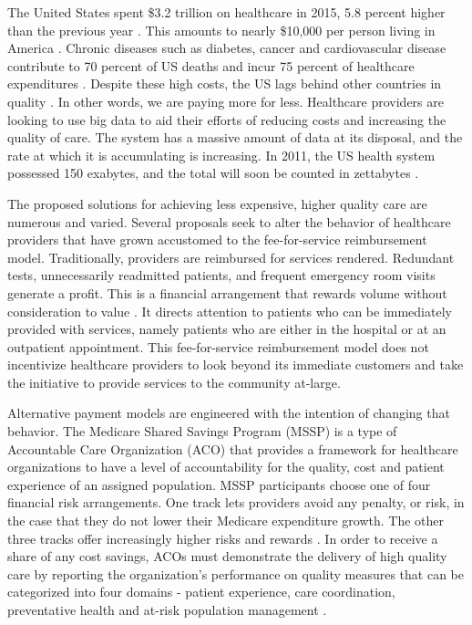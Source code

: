 \documentclass[sigconf]{acmart}
\begin{document}
 The United States spent \$3.2 trillion on healthcare in 2015, 5.8 percent higher than the previous year \cite{editor01}. This amounts to nearly \$10,000 per person living in America \cite{editor01}. Chronic diseases such as diabetes, cancer and cardiovascular disease contribute to 70 percent of US deaths and incur 75 percent of healthcare expenditures \cite{editor11}. Despite these high costs, the US lags behind other countries in quality \cite{editor06}. In other words, we are paying more for less. Healthcare providers are looking to use big data to aid their efforts of reducing costs and increasing the quality of care. The system has a massive amount of data at its disposal, and the rate at which it is accumulating is increasing. In 2011, the US health system possessed 150 exabytes, and the total will soon be counted in zettabytes \cite{editor12}.

 The proposed solutions for achieving less expensive, higher quality care are numerous and varied. Several proposals seek to alter the behavior of healthcare providers that have grown accustomed to the fee-for-service reimbursement model. Traditionally, providers are reimbursed for services rendered. Redundant tests, unnecessarily readmitted patients, and frequent emergency room visits generate a profit. This is a financial arrangement that rewards volume without consideration to value \cite{editor02}. It directs attention to patients who can be immediately provided with services, namely patients who are either in the hospital or at an outpatient appointment. This fee-for-service reimbursement model does not incentivize healthcare providers to look beyond its immediate customers and take the initiative to provide services to the community at-large.

 Alternative payment models are engineered with the intention of changing that behavior. The Medicare Shared Savings Program (MSSP) is a type of Accountable Care Organization (ACO) that provides a framework for healthcare organizations to have a level of accountability for the quality, cost and patient experience of an assigned population. MSSP participants choose one of four financial risk arrangements. One track lets providers avoid any penalty, or risk, in the case that they do not lower their Medicare expenditure growth. The other three tracks offer increasingly higher risks and rewards \cite{editor03}. In order to receive a share of any cost savings, ACOs must demonstrate the delivery of high quality care by reporting the organization's performance on quality measures that can be categorized into four domains - patient experience, care coordination, preventative health and at-risk population management \cite{editor04}.
\end{document}

